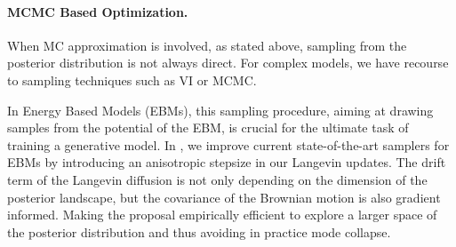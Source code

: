 \documentclass[twoside,11pt]{article}
\begin{document}
\vspace{0.08in}
\paragraph{MCMC Based Optimization.} 

When MC approximation is involved, as stated above, sampling from the posterior distribution is not always direct.
For complex models, we have recourse to sampling techniques such as VI or MCMC.

In Energy Based Models (EBMs), this sampling procedure, aiming at drawing samples from the potential of the EBM, is crucial for the ultimate task of training a generative model.
In \citep{karimi2020anila}, we improve current state-of-the-art samplers for EBMs by introducing an anisotropic stepsize in our Langevin updates.
The drift term of the Langevin diffusion is not only depending on the dimension of the posterior landscape, but the covariance of the Brownian motion is also gradient informed. 
Making the proposal empirically efficient to explore a larger space of the posterior distribution and thus avoiding in practice mode collapse.
\end{document}

